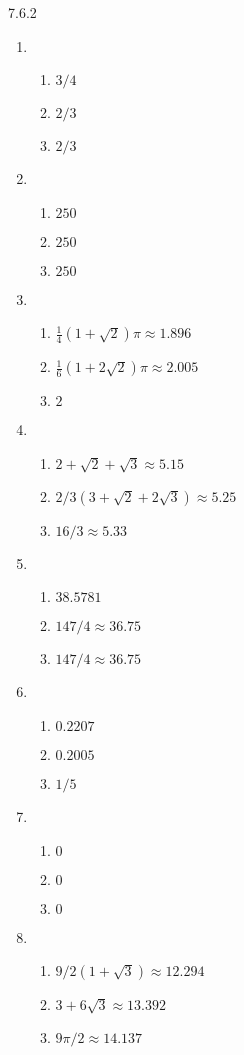 \begin{Answer}{7.6.2}
\begin{enumerate}
\item {\begin{enumerate}
\item		$3/4$
\item		$2/3$
\item		$2/3$
\end{enumerate}
}
\item {\begin{enumerate}
\item		$250$
\item		$250$
\item		$250$
\end{enumerate}
}
\item {\begin{enumerate}
\item		$\frac14(1+\sqrt2)\pi\approx 1.896$
\item		$\frac1{6}(1+2\sqrt{2})\pi\approx 2.005$
\item		$2$
\end{enumerate}
}
\item {\begin{enumerate}
\item		$2+\sqrt2+\sqrt3\approx 5.15$
\item		$2/3(3+\sqrt2+2\sqrt3)\approx 5.25$
\item		$16/3\approx 5.33$
\end{enumerate}
}
\item {\begin{enumerate}
\item		$38.5781$
\item		$147/4\approx 36.75$
\item		$147/4\approx 36.75$
\end{enumerate}
}
\item {\begin{enumerate}
\item		$0.2207$
\item		$0.2005$
\item		$1/5$
\end{enumerate}
}
\item {\begin{enumerate}
\item		$0$
\item		$0$
\item		$0$
\end{enumerate}
}
\item {\begin{enumerate}
\item		$9/2(1+\sqrt3)\approx 12.294$
\item		$3+6\sqrt3\approx 13.392$
\item		$9\pi/2\approx 14.137$
\end{enumerate}
}
\end{enumerate}
\end{Answer}

